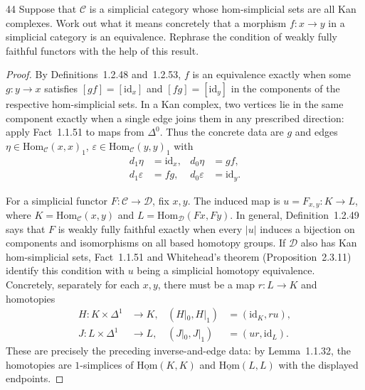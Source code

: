 \begin{exercise}{44}
Suppose that $\mathcal C$ is a simplicial category whose hom-simplicial sets are all Kan
complexes. Work out what it means concretely that a morphism $f\colon x\to y$ in a simplicial
category is an equivalence. Rephrase the condition of weakly fully faithful functors with the
help of this result.

\begin{proof}
By Definitions~1.2.48 and~1.2.53, $f$ is an equivalence
exactly when some $g\colon y\to x$ satisfies
$[gf]=[\mathrm{id}_x]$ and $[fg]=[\mathrm{id}_y]$ in the
components of the respective hom-simplicial sets.
In a Kan complex, two vertices lie in the same component
exactly when a single edge joins them in any prescribed
direction: apply Fact~1.1.51 to maps from $\Delta^0$.
Thus the concrete data are $g$ and edges
$\eta\in\mathrm{Hom}_{\mathcal C}(x,x)_1$,
$\varepsilon\in\mathrm{Hom}_{\mathcal C}(y,y)_1$ with
\[
 \begin{aligned}
  d_1\eta&=\mathrm{id}_x,& d_0\eta&=gf,\\
  d_1\varepsilon&=fg,& d_0\varepsilon&=\mathrm{id}_y.
 \end{aligned}
\]

For a simplicial functor $F\colon\mathcal C\to\mathcal D$,
fix $x,y$. The induced map is $u=F_{x,y}\colon K\to L$, where
$K=\mathrm{Hom}_{\mathcal C}(x,y)$ and
$L=\mathrm{Hom}_{\mathcal D}(Fx,Fy)$.
In general, Definition~1.2.49 says that $F$ is weakly fully
faithful exactly when every $|u|$ induces a bijection on
components and isomorphisms on all based homotopy groups.
If $\mathcal D$ also has Kan hom-simplicial sets, Fact~1.1.51
and Whitehead's theorem (Proposition~2.3.11) identify this
condition with $u$ being a simplicial homotopy equivalence.
Concretely, separately for each $x,y$, there must be a map
$r\colon L\to K$ and homotopies
\[
 \begin{aligned}
  H\colon K\times\Delta^1&\longrightarrow K,
   &(H|_0,H|_1)&=(\mathrm{id}_K,ru),\\
  J\colon L\times\Delta^1&\longrightarrow L,
   &(J|_0,J|_1)&=(ur,\mathrm{id}_L).
 \end{aligned}
\]
These are precisely the preceding inverse-and-edge data:
by Lemma~1.1.32, the homotopies are $1$-simplices of
$\underline{\mathrm{Hom}}(K,K)$ and
$\underline{\mathrm{Hom}}(L,L)$ with the displayed endpoints.
\end{proof}
\end{exercise}
